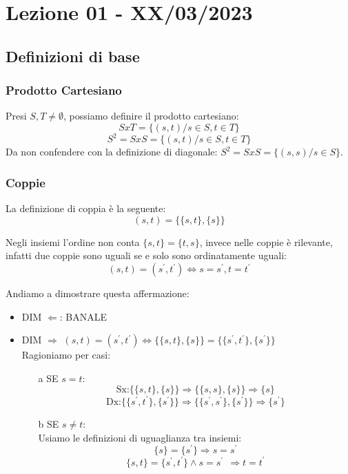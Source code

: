 \section{Lezione 01 - XX/03/2023}

\subsection{Definizioni di base}

\subsubsection{Prodotto Cartesiano}

Presi $S,T \neq \emptyset$, possiamo definire il prodotto cartesiano:
\begin{equation*}
SxT = \{(s,t)/ s \in S, t \in T\}
\end{equation*}
\begin{equation*}
S^2 = SxS = \{(s,t)/ s \in S, t \in T\}
\end{equation*}
Da non confendere con la definizione di diagonale: $ S^2 = SxS = \{(s,s)/ s \in S\} $.

\subsubsection{Coppie}
La definizione di coppia è la seguente:
\begin{equation*}
(s,t) = \{\{s,t\}, \{s\}\}
\end{equation*}

Negli insiemi l'ordine non conta $ \{s,t\} = \{t,s\}$, invece nelle coppie è rilevante, infatti due coppie sono uguali se e solo  sono ordinatamente uguali:
$$ (s,t) = (s^\prime, t^\prime) \Leftrightarrow s=s^\prime, t=t^\prime $$

Andiamo a dimostrare questa affermazione: 

\begin{itemize}
\item DIM $\Leftarrow$: BANALE
\item DIM $\Rightarrow$
$ (s,t) = (s^\prime, t^\prime) \Leftrightarrow \{\{s,t\}, \{s\}\} = \{\{s^\prime,t^\prime\}, \{s^\prime\}\} $\\
Ragioniamo per casi:
	\begin{itemize}
		\item[a] SE $s=t$:\\
			$$ \text{Sx:} \{\{s,t\}, \{s\}\} \Rightarrow \{\{s,s\},\{s\}\} \Rightarrow \{s\} $$
			$$ \text{Dx:} \{\{s^\prime,t^\prime\}, \{s^\prime\}\} \Rightarrow \{\{s^\prime,s^\prime\},\{s^\prime\}\} \Rightarrow \{s^\prime\} $$
		\item[b] SE $s \neq t$:\\
			Usiamo le definizioni di uguaglianza tra insiemi:
			$$\{s\} = \{s^\prime\} \Rightarrow s=s^\prime$$
			$$\{s,t\} = \{s^\prime,t^\prime\} \wedge s=s^\prime \:\: \Rightarrow t = t^\prime$$
	\end{itemize}
\end{itemize}

